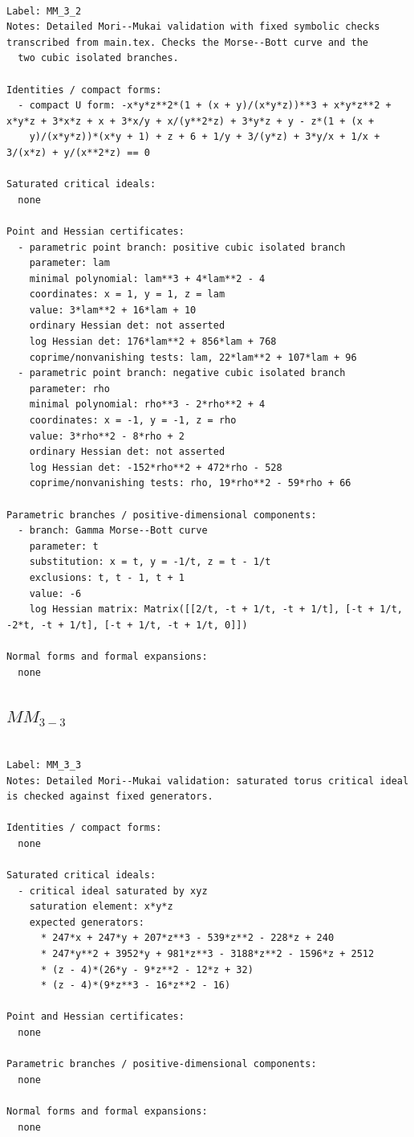 \documentclass[10pt,a4paper]{article}
\begin{document}
\begin{lstlisting}

Label: MM_3_2
Notes: Detailed Mori--Mukai validation with fixed symbolic checks transcribed from main.tex. Checks the Morse--Bott curve and the
  two cubic isolated branches.

Identities / compact forms:
  - compact U form: -x*y*z**2*(1 + (x + y)/(x*y*z))**3 + x*y*z**2 + x*y*z + 3*x*z + x + 3*x/y + x/(y**2*z) + 3*y*z + y - z*(1 + (x +
    y)/(x*y*z))*(x*y + 1) + z + 6 + 1/y + 3/(y*z) + 3*y/x + 1/x + 3/(x*z) + y/(x**2*z) == 0

Saturated critical ideals:
  none

Point and Hessian certificates:
  - parametric point branch: positive cubic isolated branch
    parameter: lam
    minimal polynomial: lam**3 + 4*lam**2 - 4
    coordinates: x = 1, y = 1, z = lam
    value: 3*lam**2 + 16*lam + 10
    ordinary Hessian det: not asserted
    log Hessian det: 176*lam**2 + 856*lam + 768
    coprime/nonvanishing tests: lam, 22*lam**2 + 107*lam + 96
  - parametric point branch: negative cubic isolated branch
    parameter: rho
    minimal polynomial: rho**3 - 2*rho**2 + 4
    coordinates: x = -1, y = -1, z = rho
    value: 3*rho**2 - 8*rho + 2
    ordinary Hessian det: not asserted
    log Hessian det: -152*rho**2 + 472*rho - 528
    coprime/nonvanishing tests: rho, 19*rho**2 - 59*rho + 66

Parametric branches / positive-dimensional components:
  - branch: Gamma Morse--Bott curve
    parameter: t
    substitution: x = t, y = -1/t, z = t - 1/t
    exclusions: t, t - 1, t + 1
    value: -6
    log Hessian matrix: Matrix([[2/t, -t + 1/t, -t + 1/t], [-t + 1/t, -2*t, -t + 1/t], [-t + 1/t, -t + 1/t, 0]])

Normal forms and formal expansions:
  none

\end{lstlisting}

\subsection*{$ MM_{3-3} $}

\begin{lstlisting}

Label: MM_3_3
Notes: Detailed Mori--Mukai validation: saturated torus critical ideal is checked against fixed generators.

Identities / compact forms:
  none

Saturated critical ideals:
  - critical ideal saturated by xyz
    saturation element: x*y*z
    expected generators:
      * 247*x + 247*y + 207*z**3 - 539*z**2 - 228*z + 240
      * 247*y**2 + 3952*y + 981*z**3 - 3188*z**2 - 1596*z + 2512
      * (z - 4)*(26*y - 9*z**2 - 12*z + 32)
      * (z - 4)*(9*z**3 - 16*z**2 - 16)

Point and Hessian certificates:
  none

Parametric branches / positive-dimensional components:
  none

Normal forms and formal expansions:
  none

\end{lstlisting}
\end{document}
